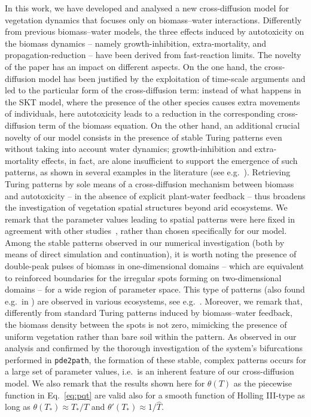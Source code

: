 \documentclass[11pt]{elsarticle}
\theoremstyle{plain}
\theoremstyle{definition}
\theoremstyle{myremark}
\begin{document}
In this work, we have developed and analysed a new cross-diffusion model for vegetation dynamics that focuses only on biomass--water interactions. Differently from previous biomass--water models, the three effects induced by autotoxicity on the biomass dynamics -- namely growth-inhibition, extra-mortality, and propagation-reduction -- have been derived from fast-reaction limits. The novelty of the paper has an impact on different aspects. On the one hand, the cross-diffusion model has been justified by the exploitation of time-scale arguments and led to the particular form of the cross-diffusion term: instead of what happens in the SKT model, where the presence of the other species causes extra movements of individuals, here autotoxicity leads to a reduction in the corresponding cross-diffusion term of the biomass equation. On the other hand, an additional crucial novelty of our model consists in the presence of stable Turing patterns even without taking into account water dynamics; growth-inhibition and extra-mortality effects, in fact, are alone insufficient to support the emergence of such patterns, as shown in several examples in the literature (see e.g.~\cite{Carteni_2012, Salvatori_2023}). Retrieving Turing patterns by sole means of a cross-diffusion mechanism between biomass and autotoxicity -- in the absence of explicit plant-water feedback -- thus broadens the investigation of vegetation spatial structures beyond arid ecosystems. We remark that the parameter values leading to spatial patterns were here fixed in agreement with other studies~\cite{Carteni_2012, De_Baets_2007, martinez1998belowground}, rather than chosen specifically for our model. 
Among the stable patterns observed in our numerical investigation (both by means of direct simulation and continuation), it is worth noting the presence of double-peak pulses of biomass in one-dimensional domains -- which are equivalent to reinforced boundaries for the irregular spots forming on two-dimensional domains -- for a wide region of parameter space. This type of patterns (also found e.g.~in \cite{Bera_2025,Jaibi_2020, rottschafer1998transition}) are observed in various ecosystems, see e.g.~\cite{Salvatori_2023,Yang_2018,Zotti_2025}. Moreover, we remark that, differently from standard Turing patterns induced by biomass--water feedback, the biomass density between the spots is not zero, mimicking the presence of uniform vegetation rather than bare soil within the pattern.
As observed in our analysis and confirmed by the thorough investigation of the system's bifurcations performed in \texttt{pde2path}, the formation of these stable, complex patterns occurs for a large set of parameter values, i.e.~is an inherent feature of our cross-diffusion model. We also remark that the results shown here for $\theta(T)$ as the piecewise function in Eq.~\eqref{eq:pqt} are valid also for a smooth function of Holling III-type as long as $\theta(T_*) \approx T_*/\hat{T}$ and $\theta'(T_*) \approx 1/\hat{T}$. \\
\end{document}
